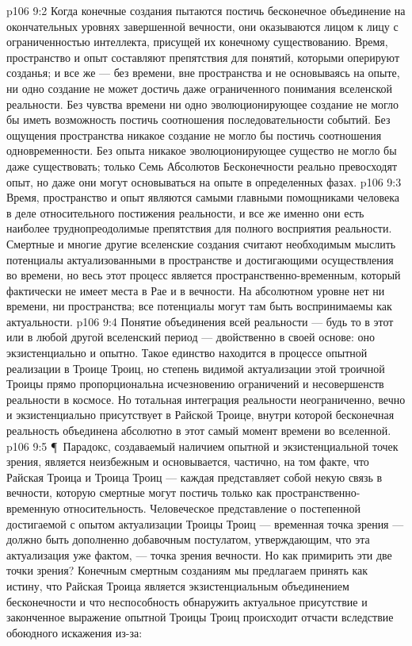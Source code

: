 \vs p106 9:2 Когда конечные создания пытаются постичь бесконечное объединение на окончательных уровнях завершенной вечности, они оказываются лицом к лицу с ограниченностью интеллекта, присущей их конечному существованию. Время, пространство и опыт составляют препятствия для понятий, которыми оперируют созданья; и все же --- без времени, вне пространства и не основываясь на опыте, ни одно создание не может достичь даже ограниченного понимания вселенской реальности. Без чувства времени ни одно эволюционирующее создание не могло бы иметь возможность постичь соотношения последовательности событий. Без ощущения пространства никакое создание не могло бы постичь соотношения одновременности. Без опыта никакое эволюционирующее существо не могло бы даже существовать; только Семь Абсолютов Бесконечности реально превосходят опыт, но даже они могут основываться на опыте в определенных фазах.
\vs p106 9:3 Время, пространство и опыт являются самыми главными помощниками человека в деле относительного постижения реальности, и все же именно они есть наиболее труднопреодолимые препятствия для полного восприятия реальности. Смертные и многие другие вселенские создания считают необходимым мыслить потенциалы актуализованными в пространстве и достигающими осуществления во времени, но весь этот процесс является пространственно\hyp{}временным, который фактически не имеет места в Рае и в вечности. На абсолютном уровне нет ни времени, ни пространства; все потенциалы могут там быть воспринимаемы как актуальности.
\vs p106 9:4 Понятие объединения всей реальности --- будь то в этот или в любой другой вселенский период --- двойственно в своей основе: оно экзистенциально и опытно. Такое единство находится в процессе опытной реализации в Троице Троиц, но степень видимой актуализации этой троичной Троицы прямо пропорциональна исчезновению ограничений и несовершенств реальности в космосе. Но тотальная интеграция реальности неограниченно, вечно и экзистенциально присутствует в Райской Троице, внутри которой бесконечная реальность объединена абсолютно в этот самый момент времени во вселенной.
\vs p106 9:5 \P\ Парадокс, создаваемый наличием опытной и экзистенциальной точек зрения, является неизбежным и основывается, частично, на том факте, что Райская Троица и Троица Троиц --- каждая представляет собой некую связь в вечности, которую смертные могут постичь только как пространственно\hyp{}временную относительность. Человеческое представление о постепенной достигаемой с опытом актуализации Троицы Троиц --- временная точка зрения --- должно быть дополненно добавочным постулатом, утверждающим, что эта актуализация уже  фактом, --- точка зрения вечности. Но как примирить эти две точки зрения? Конечным смертным созданиям мы предлагаем принять как истину, что Райская Троица является экзистенциальным объединением бесконечности и что неспособность обнаружить актуальное присутствие и законченное выражение опытной Троицы Троиц происходит отчасти вследствие обоюдного искажения из\hyp{}за:
